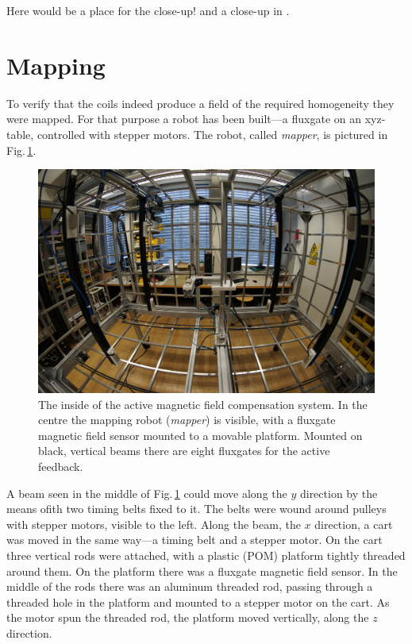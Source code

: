 Here would be a place for the close-up! and a close-up in .


\section{Mapping}
To verify that the coils indeed produce a field of the required homogeneity they were mapped. For that purpose a robot has been built---a fluxgate on an xyz-table, controlled with stepper motors. The robot, called \emph{mapper}, is pictured in Fig.\,\ref{fig:prototype_photo_inside}.

\begin{figure}
  \centering
  \includegraphics[width=0.9\linewidth]{gfx/prototype/DSC03476.JPG}
  \caption{The inside of the active magnetic field compensation system. In the centre the mapping robot (\emph{mapper}) is visible, with a fluxgate magnetic field sensor mounted to a movable platform. Mounted on black, vertical beams there are eight fluxgates for the active feedback.}
  \label{fig:prototype_photo_inside}
\end{figure}

A beam seen in the middle of Fig.\,\ref{fig:prototype_photo_inside} could move along the $y$ direction by the means ofith two timing belts fixed to it. The belts were wound around pulleys with stepper motors, visible to the left. Along the beam, the $x$ direction, a cart was moved in the same way---a timing belt and a stepper motor. On the cart three vertical rods were attached, with a plastic (POM) platform tightly threaded around them. On the platform there was a fluxgate magnetic field sensor. In the middle of the rods there was an aluminum threaded rod, passing through a threaded hole in the platform and mounted to a stepper motor on the cart. As the motor spun the threaded rod, the platform moved vertically, along the $z$ direction.

